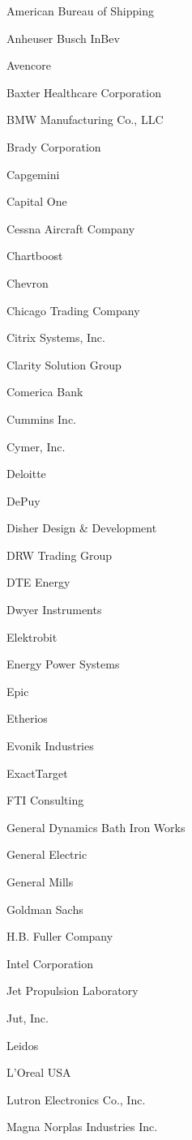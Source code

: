 \documentclass[twoside]{article}
\begin{document}
\begin{center}
\begin{multicols}{5}
\begin{FlushLeft}
\begin{compactitem}
\item American Bureau of Shipping
\item Anheuser Busch InBev
\item Avencore
\item Baxter Healthcare Corporation
\item BMW Manufacturing Co., LLC
\item Brady Corporation
\item Capgemini
\item Capital One
\item Cessna Aircraft Company
\item Chartboost
\item Chevron
\item Chicago Trading Company
\item Citrix Systems, Inc.
\item Clarity Solution Group
\item Comerica Bank
\item Cummins Inc.
\item Cymer, Inc.
\item Deloitte
\item DePuy
\item Disher Design \& Development
\item DRW Trading Group
\item DTE Energy
\item Dwyer Instruments
\item Elektrobit
\item Energy Power Systems
\item Epic
\item Etherios
\item Evonik Industries
\item ExactTarget
\item FTI Consulting
\item General Dynamics Bath Iron Works
\item General Electric
\item General Mills
\item Goldman Sachs
\item H.B. Fuller Company
\item Intel Corporation
\item Jet Propulsion Laboratory
\item Jut, Inc.
\item Leidos
\item L'Oreal USA
\item Lutron Electronics Co., Inc.
\item Magna Norplas Industries Inc.

\end{compactitem}
\end{FlushLeft}
\end{multicols}
\end{center}
\end{document}
